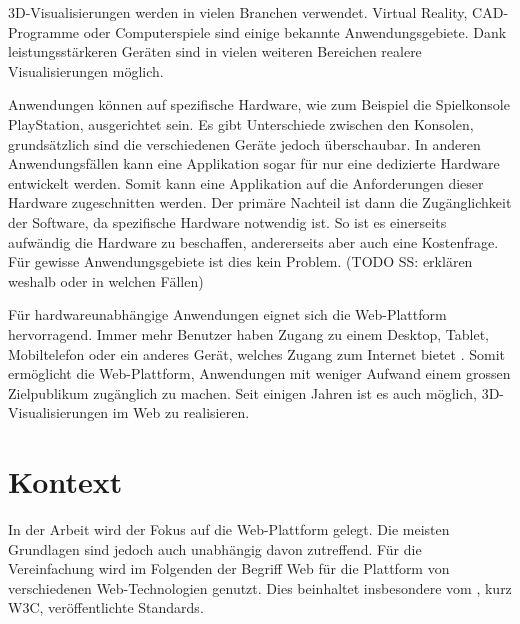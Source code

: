 
3D-Visualisierungen werden in vielen Branchen verwendet. Virtual Reality, CAD-Programme oder Computerspiele sind einige bekannte Anwendungsgebiete. Dank leistungsstärkeren Geräten sind in vielen weiteren Bereichen realere Visualisierungen möglich.

Anwendungen können auf spezifische Hardware, wie zum Beispiel die Spielkonsole PlayStation, ausgerichtet sein. Es gibt Unterschiede zwischen den Konsolen, grundsätzlich sind die verschiedenen Geräte jedoch überschaubar. In anderen Anwendungsfällen kann eine Applikation sogar für nur eine dedizierte Hardware entwickelt werden. Somit kann eine Applikation auf die Anforderungen dieser Hardware zugeschnitten werden. Der primäre Nachteil ist dann die Zugänglichkeit der Software, da spezifische Hardware notwendig ist. So ist es einerseits aufwändig die Hardware zu beschaffen, andererseits aber auch eine Kostenfrage. Für gewisse Anwendungsgebiete ist dies kein Problem. (TODO SS: erklären weshalb oder in welchen Fällen)

Für hardwareunabhängige Anwendungen eignet sich die Web-Plattform hervorragend.
Immer mehr Benutzer haben Zugang zu einem Desktop, Tablet, Mobiltelefon oder ein anderes Gerät, welches Zugang zum Internet bietet \cite{peopleWithInternetAccess}.
Somit ermöglicht die Web-Plattform, Anwendungen mit weniger Aufwand einem grossen Zielpublikum zugänglich zu machen.
Seit einigen Jahren ist es auch möglich, 3D-Visualisierungen im Web zu realisieren.

\section{Kontext}
In der Arbeit wird der Fokus auf die Web-Plattform gelegt. Die meisten Grundlagen sind jedoch auch unabhängig davon zutreffend.
Für die Vereinfachung wird im Folgenden der Begriff Web für die Plattform von verschiedenen Web-Technologien genutzt. Dies beinhaltet insbesondere vom , kurz W3C, veröffentlichte Standards.

